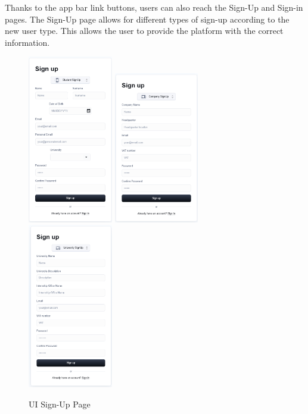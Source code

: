 \noindent Thanks to the app bar link buttons, users can also reach the Sign-Up and Sign-in pages. The Sign-Up page allows for different types of sign-up according to the new user type. This allows the user to provide the platform with the correct information.
\begin{figure}[H]
    \includegraphics[width=0.33\textwidth]{Latex/Images/New Ui/SignUp Student.png}
    \includegraphics[width=0.33\textwidth]{Latex/Images/New Ui/SignUp Company.png}
    \includegraphics[width=0.33\textwidth]{Latex/Images/New Ui/SignUp University.png}
    \caption{UI Sign-Up Page}
    \label{fig:signuppage}
\end{figure}
